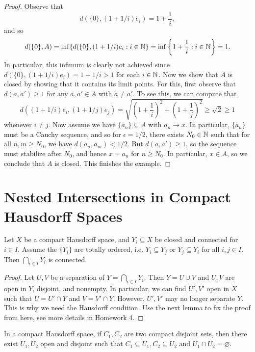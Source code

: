 \begin{proof}
  Observe that
  \[
    d\left(\{0\}, (1 + 1 / i) e_i\right) = 1 + \frac{1}{i},
  \]
  and so
  \[
    d(\{0\}, A) =
    \inf\{
      d(\{0\}, (1 + 1 / i) e_i : i \in \mathbb{N}
    \}
    = \inf\left\{1 + \frac{1}{i} : i \in \mathbb{N}\right\} = 1.
  \]
  In particular, this infimum is clearly not
  achieved since $d(\{0\}, (1 + 1 / i) e_i) = 1 + 1 / i > 1$
  for each $i \in \mathbb{N}$. Now
  we show that $A$ is closed by showing that it
  contains its limit points. For this, first observe that
  $d(a, a') \ge 1$ for any $a, a' \in A$ with $a \ne a'$. To see this, we can compute that
  \[
    d\left((1 + 1 / i) e_i, (1 + 1 / j) e_j\right) =
    \sqrt{
      \left(1 + \frac{1}{i}\right)^2 + \left(1 + \frac{1}{j}\right)^2
    } \ge \sqrt{2} \ge 1
  \]
  whenever $i \ne j$.
  Now assume we have $\{a_n\} \subseteq A$ with
  $a_n \to x$. In particular, $\{a_n\}$ must be
  a Cauchy sequence, and so for $\epsilon = 1 / 2$,
  there exists $N_0 \in \mathbb{N}$ such that for all
  $n, m \ge N_0$, we have $d(a_n, a_m) < 1 / 2$.
  But $d(a, a') \ge 1$, so the sequence must stabilize
  after $N_0$, and hence $x = a_n$ for $n \ge N_0$.
  In particular, $x \in A$, so we conclude that
  $A$ is closed. This finishes the example.
\end{proof}

\section{Nested Intersections in Compact Hausdorff Spaces}

\begin{prop}
  Let $X$ be a compact Hausdorff space, and $Y_i \subseteq X$ be closed and connected for $i \in I$.
  Assume the $\{Y_i\}$ are totally ordered,
  i.e. $Y_i \subseteq Y_j$ or $Y_j \subseteq Y_i$ for
  all $i, j \in I$.
  Then $\bigcap_{i \in I} Y_i$ is connected.
\end{prop}

\begin{proof}
  Let $U, V$ be a separation of
  $Y = \bigcap_{i \in I} Y_i$. Then $Y = U \cup V$
  and
  $U, V$ are open in $Y$, disjoint, and nonempty.
  In particular, we can find $U', V'$ open in $X$
  such that $U = U' \cap Y$ and $V = V' \cap Y$.
  However, $U', V'$ may no longer separate $Y$. This
  is why we need the Hausdorff condition. Use the
  next lemma to fix the proof from here, see more
  details in Homework 4.
\end{proof}

\begin{lemma}
  In a compact Hausdorff space, if $C_1, C_2$
  are two compact disjoint sets, then there
  exist $U_1, U_2$ open and disjoint such that
  $C_1 \subseteq U_1, C_2 \subseteq U_2$
  and $U_1 \cap U_2 = \varnothing$.
\end{lemma}


